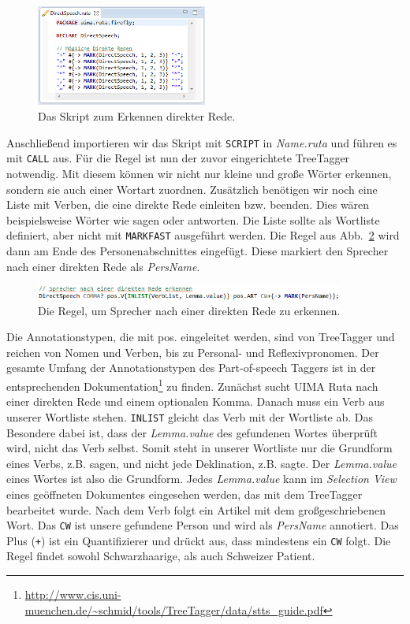 \documentclass{article}
\begin{document}
\begin{figure}
\centering
\includegraphics[width=0.5\textwidth]{figs/tt_speech.png}
\caption{Das Skript zum Erkennen direkter Rede.}
\label{speech}
\end{figure}

Anschließend importieren wir das Skript mit \texttt{SCRIPT} in \textit{Name.ruta} und füh\-ren es mit \texttt{CALL} aus. Für die Regel ist nun der zuvor eingerichtete TreeTagger notwendig. Mit diesem können wir nicht nur kleine und große Wörter erkennen, sondern sie auch einer Wortart zuordnen. Zusätzlich benötigen wir noch eine Liste mit Verben, die eine direkte Rede einleiten bzw. beenden. Dies wären beispielsweise Wörter wie \glqq sagen\grqq{} oder \glqq antworten\grqq{}. Die Liste sollte als Wortliste definiert, aber nicht mit \texttt{MARKFAST} ausgeführt werden. Die Regel aus Abb.~\ref{speech2} wird dann am Ende des Personenabschnittes eingefügt. Diese markiert den Sprecher nach einer direkten Rede als \textit{PersName}.

\begin{figure}
\centering
\includegraphics[width=0.9\textwidth]{figs/tt_speech2.png}
\caption{Die Regel, um Sprecher nach einer direkten Rede zu erkennen.}
\label{speech2}
\end{figure}

Die Annotationstypen, die mit \glqq pos.\grqq{} eingeleitet werden, sind von TreeTagger und reichen von Nomen und Verben, bis zu Personal- und Reflexivpronomen. Der gesamte Umfang der Annotationstypen des Part-of-speech Taggers ist in der entsprechenden Dokumentation\footnote{\url{http://www.cis.uni-muenchen.de/~schmid/tools/TreeTagger/data/stts_guide.pdf}} zu finden. Zunächst sucht UIMA Ruta nach einer direkten Rede und einem optionalen Komma. Danach muss ein Verb aus unserer Wortliste stehen. \texttt{INLIST} gleicht das Verb mit der Wortliste ab. Das Besondere dabei ist, dass der \textit{Lemma.value} des gefundenen Wortes überprüft wird, nicht das Verb selbst. Somit steht in unserer Wortliste nur die Grundform eines Verbs, z.B. \glqq sagen\grqq{}, und nicht jede Deklination, z.B. \glqq sagte\grqq{}. Der \textit{Lemma.value} eines Wortes ist also die Grundform. Jedes \textit{Lemma.value} kann im \textit{Selection View} eines geöffneten Dokumentes eingesehen werden, das mit dem TreeTagger bearbeitet wurde. Nach dem Verb folgt ein Artikel mit dem großgeschriebenen Wort. Das \texttt{CW} ist unsere gefundene Person und wird als \textit{PersName} annotiert. Das Plus (\texttt{+}) ist ein Quantifizierer und drückt aus, dass mindestens ein \texttt{CW} folgt. Die Regel findet sowohl \glqq Schwarzhaarige\grqq{}, als auch \glqq Schweizer Patient\grqq{}.
\end{document}
